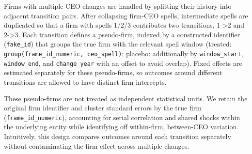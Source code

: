 Firms with multiple CEO changes are handled by splitting their history into adjacent transition pairs. After collapsing firm-CEO spells, intermediate spells are duplicated so that a firm with spells 1/2/3 contributes two transitions, 1->2 and 2->3. Each transition defines a pseudo-firm, indexed by a constructed identifier (\texttt{fake\_id}) that groups the true firm with the relevant spell window (treated: \texttt{group(frame\_id\_numeric, ceo\_spell)}; placebo: additionally by \texttt{window\_start}, \texttt{window\_end}, and \texttt{change\_year} with an offset to avoid overlap). Fixed effects are estimated separately for these pseudo-firms, so outcomes around different transitions are allowed to have distinct firm intercepts.

These pseudo-firms are not treated as independent statistical units. We retain the original firm identifier and cluster standard errors by the true firm (\texttt{frame\_id\_numeric}), accounting for serial correlation and shared shocks within the underlying entity while identifying off within-firm, between-CEO variation. Intuitively, this design compares outcomes around each transition separately without contaminating the firm effect across multiple changes.